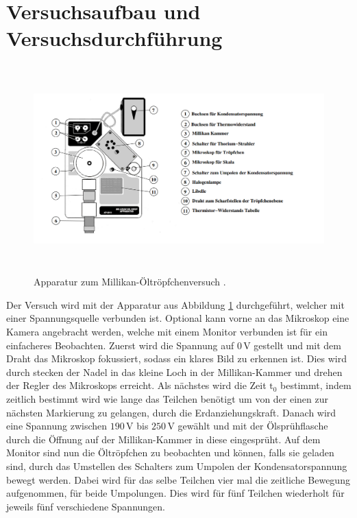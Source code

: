 \section{Versuchsaufbau und Versuchsdurchführung}

\begin{figure}[H]     
    \centering
    \includegraphics[height=80mm]{bilder/Abb2.png}
    \caption{ Apparatur zum Millikan-Öltröpfchenversuch \cite{a1}. \label{Abbildung2} }
\end{figure}

\begin{flushleft}
    Der Versuch wird mit der Apparatur aus Abbildung \ref{Abbildung2} durchgeführt, welcher mit einer Spannungsquelle verbunden ist.
    Optional kann vorne an das Mikroskop eine Kamera angebracht werden, welche mit einem Monitor verbunden ist für ein einfacheres Beobachten.
    Zuerst wird die Spannung auf $0\,\unit{\volt}$ gestellt und mit dem Draht das Mikroskop fokussiert, sodass ein klares Bild zu erkennen ist.
    Dies wird durch stecken der Nadel in das kleine Loch in der Millikan-Kammer und drehen der Regler des Mikroskops erreicht.
    Als nächstes wird die Zeit $\text{t}_{0}$ bestimmt, indem zeitlich bestimmt wird wie lange das Teilchen benötigt um von der einen zur nächsten Markierung zu gelangen, durch die Erdanziehungskraft.
    Danach wird eine Spannung zwischen $ 190\,\unit{\volt}$ bis $250\,\unit{\volt}$ gewählt und mit der Ölsprühflasche durch die Öffnung auf der Millikan-Kammer in diese eingesprüht. 
    Auf dem Monitor sind nun die Öltröpfchen zu beobachten und können, falls sie geladen sind, durch das Umstellen des Schalters zum Umpolen der Kondensatorspannung bewegt werden.
    Dabei wird für das selbe Teilchen vier mal die zeitliche Bewegung aufgenommen, für beide Umpolungen.
    Dies wird für fünf Teilchen wiederholt für jeweils fünf verschiedene Spannungen. 
\end{flushleft}